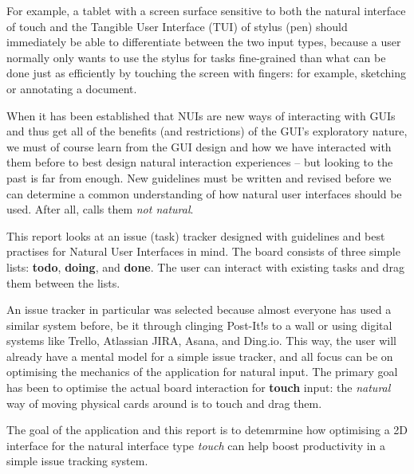 For example, a tablet with a screen surface sensitive to both the natural interface of touch and the Tangible User Interface (TUI) \autocite{ishii-ullmer:tangible-bits-towards-seamless-interfaces-between-people-bits-and-atoms:1997} of stylus (pen) should immediately be able to differentiate between the two input types, because a user normally only wants to use the stylus for tasks fine-grained than what can be done just as efficiently by touching the screen with fingers: for example, sketching or annotating a document.

When it has been established that NUIs are new ways of interacting with GUIs and thus get all of the benefits (and restrictions) of the GUI's exploratory nature, we must of course learn from the GUI design and how we have interacted with them before to best design natural interaction experiences -- but looking to the past is far from enough. New guidelines must be written and revised before we can determine a common understanding of how natural user interfaces should be used. After all, \textcite{norman:natural-user-interfaces-are-not-natural:2010} calls them \textit{not natural}.


This report looks at an issue (task) tracker designed with guidelines and best practises for Natural User Interfaces in mind.  The board consists of three simple lists: \textbf{todo}, \textbf{doing}, and \textbf{done}. The user can interact with existing tasks and drag them between the lists.

An issue tracker in particular was selected because almost everyone has used a similar system before, be it through clinging Post-It!s to a wall or using digital systems like Trello, Atlassian JIRA, Asana, and Ding.io. This way, the user will already have a mental model for a simple issue tracker, and all focus can be on optimising the mechanics of the application for natural input. The primary goal has been to optimise the actual board interaction for \textbf{touch} input: the \textit{natural} way of moving physical cards around is to touch and drag them.

The goal of the application and this report is to detemrmine how optimising a 2D interface for the natural interface type \textit{touch} can help boost productivity in a simple issue tracking system.
